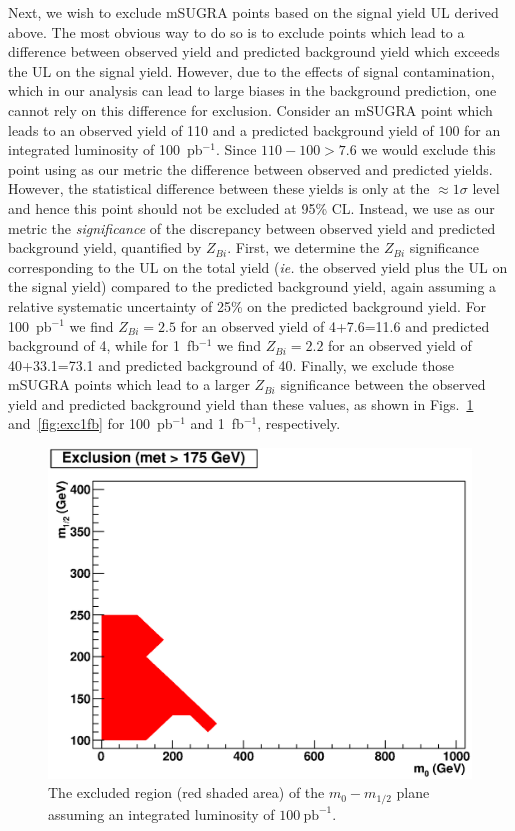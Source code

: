 Next, we  wish to exclude mSUGRA  points based on the  signal yield UL
derived above.   The most obvious  way to do  so is to  exclude points
which  lead  to a  difference  between  observed  yield and  predicted
background yield  which exceeds the  UL on the signal  yield. However,
due to the effects of  signal contamination, which in our analysis can
lead to large biases in  the background prediction, one cannot rely on
this difference for exclusion. Consider an mSUGRA point which leads to
an observed yield  of 110 and a predicted background  yield of 100 for
an  integrated luminosity  of 100~pb$^{-1}$.   Since  $110-100>7.6$ we
would exclude  this point using  as our metric the  difference between
observed  and predicted  yields. However,  the  statistical difference
between these yields  is only at the $\approx1\sigma$  level and hence
this point should  not be excluded at 95\% CL. Instead,  we use as our
metric  the {\em  significance}  of the  discrepancy between  observed
yield and predicted background  yield, quantified by $Z_{Bi}$.  First,
we determine the $Z_{Bi}$ significance  corresponding to the UL on the
total yield ({\em  ie.}  the observed yield plus the  UL on the signal
yield) compared  to the predicted  background yield, again  assuming a
relative systematic  uncertainty of  25\% on the  predicted background
yield.  For  100~pb$^{-1}$ we find $Z_{Bi}=2.5$ for  an observed yield
of 4+7.6=11.6 and predicted background  of 4, while for 1~fb$^{-1}$ we
find $Z_{Bi}=2.2$ for an  observed yield of 40+33.1=73.1 and predicted
background of 40.  Finally, we  exclude those mSUGRA points which lead
to  a larger  $Z_{Bi}$  significance between  the  observed yield  and
predicted   background  yield   than   these  values,   as  shown   in
Figs.~\ref{fig:exc100pb}  and~\ref{fig:exc1fb}  for 100~pb$^{-1}$  and
1~fb$^{-1}$, respectively.

\begin{figure}[htb]
\begin{center}
\includegraphics[width=0.7\linewidth]{figs/hexc175_100pb.eps}
\caption{The excluded region (red  shaded area) of the $m_{0}-m_{1/2}$
plane       assuming      an       integrated       luminosity      of
$100~\mathrm{pb}^{-1}$. \label{fig:exc100pb}}
\end{center}
\end{figure}

